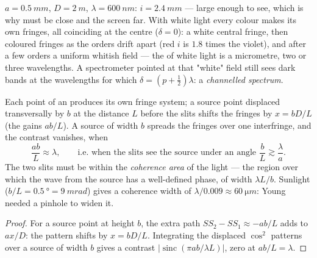 \begin{example}\label{ex:b2:two-wave-interference:numbers}
$a = \qty{0.5}{mm}$, $D = \qty{2}{m}$, $\lambda = \qty{600}{nm}$: $i = \qty{2.4}{mm}$ --- large
enough to see, which is why  must be close and the screen
far. With white light every colour makes its own fringes, all
coinciding at the centre ($\delta = 0$): a white central fringe, then
coloured fringes as the orders drift apart (red $i$ is $1.8$ times the
violet), and after a few orders a uniform whitish field --- the
 of white light is a micrometre, two or three
wavelengths. A spectrometer pointed at that "white" field still sees
dark bands at the wavelengths for which $\delta = (p + \tfrac12)\lambda$: a
\emph{channelled spectrum}.
\end{example}

\begin{proposition}\label{prop:b2:two-wave-interference:spatial}
Each point of an  produces its own fringe system; a
source point displaced transversally by $b$ at the distance $L$ before
the slits shifts the fringes by $x = bD/L$ (the  gains
$ab/L$). A source of width $b$ spreads the fringes over one interfringe,
and the contrast vanishes, when
\[
\frac{ab}L \approx \lambda , \qquad\text{i.e. when the slits see the source under an angle } \frac bL \gtrsim \frac\lambda a .
\]
The two slits must be within the \emph{coherence area} of the light ---
the region over which the wave from the source has a well-defined
phase, of width $\lambda L/b$. Sunlight ($b/L = \qty{0.5}{\degree} = \qty{9}{mrad}$)
gives a coherence width of $\lambda/0.009 \approx \qty{60}{\micro m}$: Young needed a
pinhole to widen it.
\end{proposition}

\begin{proof}
For a source point at height $b$, the extra path $SS_2 - SS_1 \approx -ab/L$
adds to $ax/D$: the pattern shifts by $x = bD/L$. Integrating the
displaced $\cos^2$ patterns over a source of width $b$ gives a contrast
$|\operatorname{sinc}(\pi ab/\lambda L)|$, zero at $ab/L = \lambda$.
\end{proof}

